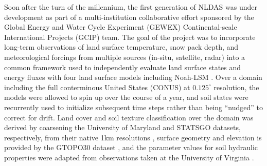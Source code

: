 Soon after the turn of the millennium, the first generation of NLDAS was under development as part of a multi-institution collaborative effort sponsored by the Global Energy and Water Cycle Experiment (GEWEX) Continental-scale International Projects (GCIP) team. The goal of the project was to incorporate long-term observations of land surface temperature, snow pack depth, and meteorological forcings from multiple sources (in-situ, satellite, radar) into a common framework used to independently evaluate land surface states and energy fluxes with four land surface models including Noah-LSM \citep{mitchell_multi-institution_2004}. Over a domain including the full conterminous United States (CONUS) at $0.125^\circ$ resolution, the models were allowed to spin up over the course of a year, and soil states were recurrently used to initialize subsequent time steps rather than being ``nudged'' to correct for drift. Land cover and soil texture classification over the domain was derived by coarsening the University of Maryland and STATSGO datasets, respectively, from their native 1km resolutions \citep{hansen_global_2000}, surface geometry and elevation is provided by the GTOPO30 dataset \citep{earth_resources_observation_and_science_centeru_s_geological_surveyu_s_department_of_the_interior_usgs_1997}, and the parameter values for soil hydraulic properties were adapted from observations taken at the University of Virginia \citep{cosby_statistical_1984}.

